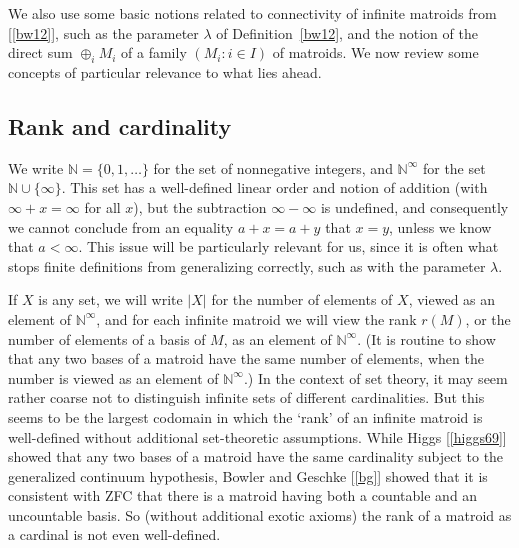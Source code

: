 \documentclass{amsart}
\theoremstyle{plain}
\theoremstyle{definition}
\newcommand{\bN}{\mathbb N}
\newcommand{\enn}{\mathbb{N}^{\infty}}
\begin{document}
We also use some basic notions related to connectivity of infinite matroids from [\ref{bw12}], 
such as the parameter $\lambda$ of Definition~\ref{bw12}, and the notion of the 
direct sum $\oplus_{i}M_i$ of a family $(M_i : i \in I)$ of matroids. 
We now review some concepts of particular relevance to what lies ahead.  

\subsection*{Rank and cardinality}

We write $\bN = \{0, 1, \dotsc\}$ for the set of nonnegative integers, 
and $\enn$ for the set $\bN \cup \{\infty\}$. This set has a well-defined linear 
order and notion of addition (with $\infty + x = \infty$ for all $x$), 
but the subtraction $\infty - \infty$ is undefined, 
and consequently we cannot conclude from an equality $a + x = a + y$ that $x = y$, 
unless we know that $a < \infty$. 
This issue will be particularly relevant for us, 
since it is often what stops finite definitions from generalizing correctly, 
such as with the parameter $\lambda$. 

If $X$ is any set, we will write $|X|$ for the number of elements of $X$, 
viewed as an element of $\enn$, and for each infinite matroid we will view the rank 
$r(M)$, or the number of elements of a basis of $M$, as an element of $\enn$. 
(It is routine to show that any two bases of a matroid 
have the same number of elements, when the number is viewed as an element of $\enn$.)
In the context of set theory, it may seem rather coarse not to distinguish 
infinite sets of different cardinalities. But this seems to be the largest codomain 
in which the `rank' of an infinite matroid is well-defined without additional set-theoretic assumptions. 
 While Higgs [\ref{higgs69}] showed that any two bases of a matroid
have the same cardinality subject to the generalized continuum hypothesis, 
Bowler and Geschke [\ref{bg}] showed that it is consistent with ZFC that 
there is a matroid having both a countable and an uncountable basis. 
So (without additional exotic axioms) the rank of a matroid as a cardinal is not 
even well-defined. 
\end{document}
